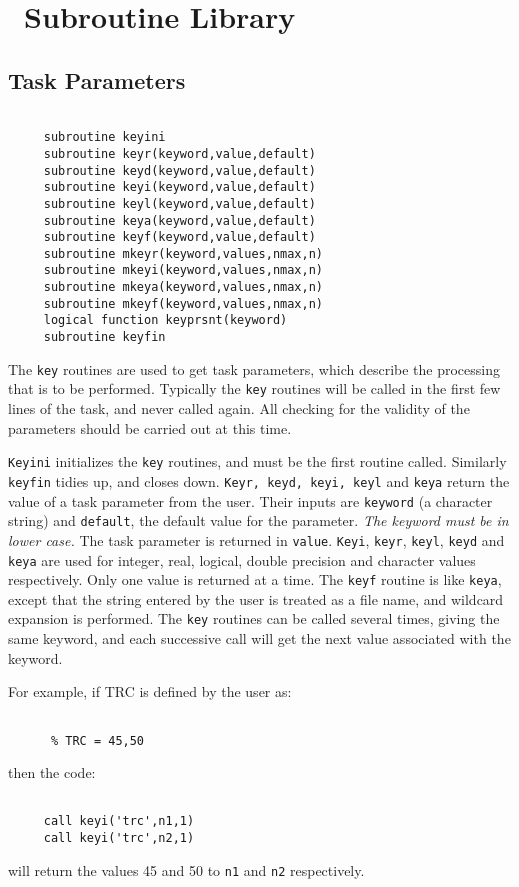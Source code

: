 \newchapter
\chapter{\miriad\ Subroutine Library}
\section{Task Parameters}
\begin{verbatim}

     subroutine keyini
     subroutine keyr(keyword,value,default)
     subroutine keyd(keyword,value,default)
     subroutine keyi(keyword,value,default)
     subroutine keyl(keyword,value,default)
     subroutine keya(keyword,value,default)
     subroutine keyf(keyword,value,default)
     subroutine mkeyr(keyword,values,nmax,n)
     subroutine mkeyi(keyword,values,nmax,n)
     subroutine mkeya(keyword,values,nmax,n)
     subroutine mkeyf(keyword,values,nmax,n)
     logical function keyprsnt(keyword)
     subroutine keyfin

\end{verbatim}
The {\tt key} routines are used to get task parameters, which describe the
processing that is to be performed.
Typically the {\tt key} routines
will be called in the first few lines of the task, and never called
again. All checking for the validity of the parameters should be
carried out at this time.

{\tt Keyini} initializes the {\tt key} routines, and must be the first
routine called. Similarly {\tt keyfin} tidies up, and closes down.
{\tt Keyr, keyd, keyi, keyl} and {\tt keya} return the value of a task parameter
from the user. Their inputs are {\tt keyword} (a character string) and
{\tt default}, the default value for the parameter. {\em The
keyword must be in lower case.} The task
parameter is returned in {\tt value}.
 {\tt Keyi}, {\tt keyr}, {\tt keyl}, {\tt keyd} and {\tt keya} are used
for integer, real, logical, double precision  and character values respectively.
Only one value is returned at a time.
The {\tt keyf} routine is like {\tt keya}, except that the string entered
by the user is treated as a file name, and wildcard expansion is performed.
The {\tt key} routines can be called several times, giving the same
keyword, and each successive call will get the next value associated
with the keyword.

For example, if TRC is defined by the user as:
\begin{verbatim}

      % TRC = 45,50

\end{verbatim}
then the code:
\begin{verbatim}

     call keyi('trc',n1,1)
     call keyi('trc',n2,1)

\end{verbatim}
will return the values 45 and 50 to {\tt n1} and {\tt n2} respectively.

